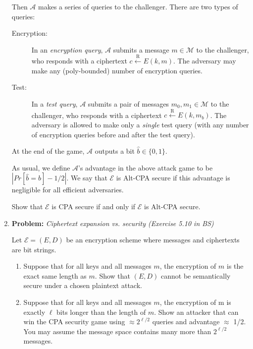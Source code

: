\documentclass[11pt]{article}
\begin{document}
\begin{enumerate}
      
        Then $\mathcal{A}$ makes a series of queries to the challenger. There are two types of queries:
        \begin{description}
        	\item[Encryption:] In an \textit{encryption query}, $\mathcal{A}$ submits a message $m  \in \mathcal{M}$ to the challenger, who responds with a ciphertext $c \xleftarrow{\text{R}} E(k, m)$. The adversary may make any (poly-bounded) number of encryption queries.
        	\item[Test:] In a \textit{test query}, $\mathcal{A}$ submits a pair of messages $m_0, m_1 \in \mathcal{M}$ to the challenger, who responds with a ciphertext $c \xleftarrow{\text{R}} E(k, m_b)$. The adversary is allowed to make only a \textit{single} test query (with any number of encryption queries before and after the test query).
        \end{description}

        At the end of the game, $\mathcal{A}$ outputs a bit $\hat{b} \in \{0,1\}$.
        
        
        As usual, we define $\mathcal{A}$’s advantage in the above attack game to be $|Pr[\hat{b}= b]-1/2|$. We say that
        $\mathcal{E}$ is Alt-CPA secure if this advantage is negligible for all efficient adversaries.
        
        Show that $\mathcal{E}$ is CPA secure if and only if $\mathcal{E}$ is Alt-CPA secure.
		
		\item
		\textbf{Problem:} \textit{Ciphertext expansion vs. security (Exercise 5.10 in BS)}
			
		Let $\mathcal{E} = (E,D)$ be an encryption scheme where	messages and ciphertexts are bit strings.
		\begin{enumerate}
	
		 \item Suppose that for all keys and all messages $m$, the encryption of $m$ is the exact same length as $m$. Show that $(E, D)$ cannot be semantically secure under a chosen plaintext attack.
		\item Suppose that for all keys and all messages $m$, the encryption of m is exactly $\ell$ bits longer
		than the length of $m$. Show an attacker that can win the CPA security game using $\approx 2^{\ell/2}$
		queries and advantage $\approx$ 1/2. You may assume the message space contains many more than
		$2^{\ell/2}$ messages.
		\end{enumerate}
	\end{enumerate}
	
\end{document}
